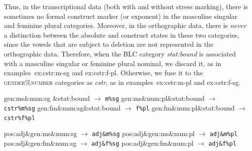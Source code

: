 \begin{description}
Thus, in the transcriptional data (both with and without stress marking), there is sometimes no formal construct marker (or exponent) in the masculine singular and feminine plural categories. Moreover, in the orthographic data, there is \emph{never} a distinction between the absolute and construct states in these two categories, since the vowels that are subject to deletion are not represented in the orthographic data.
Therefore, when the BLC category \textit{stat:bound}  is associated with a masculine singular or feminine plural nominal, we discard it, as in examples~{ex:cstr:m-sg} and {ex:cstr:f-pl}. Otherwise, we fuse it to the \textsc{gender}\%\textsc{number} categories as \textit{cstr}, as in examples~{ex:cstr:m-pl} and {ex:cstr:f-sg}.
\begin{exe}
\ex \begin{xlist}
		\ex gen:ms\&num:sg \&stat:bound \quad $\to$ \quad \texttt{m\%sg} \label{ex:cstr:m-sg}
		\ex gen:ms\&num:pl\&stat:bound \quad $\to$ \quad \texttt{cstr\%m\%sg} \label{ex:cstr:m-pl}
		\ex gen:fm\&num:sg\&stat:bound  \quad $\to$ \quad \texttt{f\%pl} \label{ex:cstr:f-sg}
		\ex gen:fm\&num:pl\&stat:bound \quad $\to$ \quad \texttt{cstr\%f\%pl} \label{ex:cstr:f-pl}
	\end{xlist}
\ex \label{ex:adj-cats} \begin{xlist}
		\ex pos:adj\&gen:ms\&num:sg \quad $\to$ \quad \texttt{adj\&m\%sg} \label{ex:adj:m-sg}
		\ex pos:adj\&gen:ms\&num:pl \quad $\to$ \quad \texttt{adj\&m\%pl} \label{ex:adj:m-pl}
		\ex pos:adj\&gen:fm\&num:sg \quad $\to$ \quad \texttt{adj\&f\%sg} \label{ex:adj:f-sg}
		\ex pos:adj\&gen:fm\&num:pl \quad $\to$ \quad \texttt{adj\&f\%pl} \label{ex:adj:f-pl}
	\end{xlist}
\end{exe}


\end{description}
